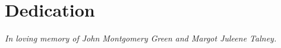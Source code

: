 \chapter{Dedication}
\textit{In loving memory of John Montgomery Green and Margot Juleene Talney.} 


